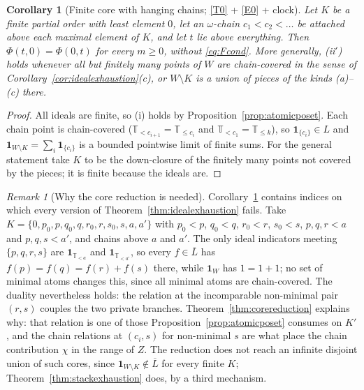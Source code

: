 \documentclass[11pt,a4paper]{article}
\theoremstyle{plain}
\newtheorem{corollary}[theorem]{Corollary}
\theoremstyle{definition}
\theoremstyle{remark}
\newtheorem{remark}[theorem]{Remark}
\newcommand{\T}{\mathbb{T}}                     %
\newcommand{\one}{\mathbf{1}}
\begin{document}
\begin{corollary}[Finite core with hanging chains; \eqref{T0} + \eqref{E0} + clock]
  \label{cor:corereduction}
  Let $K$ be a finite partial order with least element $0$, let an
  $\omega$-chain $c_1 < c_2 < \dots$ be attached above each maximal element of
  $K$, and let $t$ lie above everything.  Then $\Phi(t,0) = \Phi(0,t)$ for
  every $m \geq 0$, without \eqref{eq:Fcond}.  More generally, (ii$'$) holds
  whenever all but finitely many points of $W$ are chain-covered in the sense
  of Corollary~\ref{cor:idealexhaustion}(c), or $W \setminus K$ is a union of
  pieces of the kinds (a)--(c) there.
\end{corollary}

\begin{proof}
  All ideals are finite, so (i) holds by Proposition~\ref{prop:atomicposet}.
  Each chain point is chain-covered ($\T_{<c_{i+1}} = \T_{\leq c_i}$ and
  $\T_{<c_1} = \T_{\leq k}$), so $\one_{\{c_i\}} \in L$ and
  $\one_{W \setminus K} = \sum_i \one_{\{c_i\}}$ is a bounded pointwise limit of
  finite sums.  For the general statement take $K$ to be the down-closure of
  the finitely many points not covered by the pieces; it is finite because the
  ideals are.
\end{proof}

\begin{remark}[Why the core reduction is needed]
  \label{rem:corereduction}
  Corollary~\ref{cor:corereduction} contains indices on which every version of
  Theorem~\ref{thm:idealexhaustion} fails.  Take $K = \{0, p_0, p, q_0, q,
  r_0, r, s_0, s, a, a'\}$ with $p_0 < p$, $q_0 < q$, $r_0 < r$, $s_0 < s$,
  $p, q, r < a$ and $p, q, s < a'$, and chains above $a$ and $a'$.  The only
  ideal indicators meeting $\{p,q,r,s\}$ are $\one_{\T_{<a}}$ and
  $\one_{\T_{<a'}}$, so every $f \in \overline{L}$ has
  $f(p) = f(q) = f(r) + f(s)$ there, while $\one_W$ has $1 = 1 + 1$; no set of
  minimal atoms changes this, since all minimal atoms are chain-covered.  The
  duality nevertheless holds: the relation at the incomparable non-minimal pair
  $(r,s)$ couples the two private branches.  Theorem~\ref{thm:corereduction}
  explains why: that relation is one of those Proposition~\ref{prop:atomicposet}
  consumes on $K'$, and the chain relations at $(c_i, s)$ for non-minimal $s$
  are what place the chain contribution $\chi$ in the range of $Z$.  The
  reduction does not reach an infinite disjoint union of such cores, since
  $\one_{W \setminus K} \notin \overline{L}$ for every finite $K$;
  Theorem~\ref{thm:stackexhaustion} does, by a third mechanism.
\end{remark}
\end{document}
